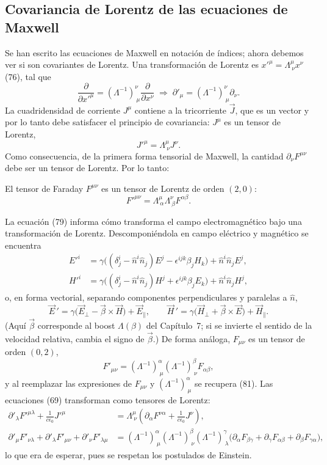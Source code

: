 \subsection{Covariancia de Lorentz de las ecuaciones de Maxwell}

Se han escrito las ecuaciones de Maxwell en notación de índices; ahora
debemos ver si son covariantes de Lorentz. Una transformación de
Lorentz es $x'^\mu=\Lambda^\mu_{\ \nu}x^\nu$ (76), tal que
\[
\frac{\partial}{\partial x'^\mu}=(\Lambda^{-1})^\nu_{\ \mu}\frac{
\partial}{\partial x^\nu}\;\Longrightarrow\;\partial'_\mu=(\Lambda^{-1})^
\nu_{\ \mu}\partial_\nu. \tag{77}
\]
La cuadridensidad de corriente $J^\mu$ contiene a la tricorriente $\vec
J$, que es un vector y por lo tanto debe satisfacer el principio de
covariancia: $J^\mu$ es un tensor de Lorentz,
\[
J'^\mu=\Lambda^\mu_{\ \nu}J^\nu . \tag{78}
\]
Como consecuencia, de la primera forma tensorial de Maxwell, la cantidad
$\partial_\nu F^{\mu\nu}$ debe ser un tensor de Lorentz. Por lo tanto:

\begin{definicion}
El tensor de Faraday $F^{\mu\nu}$ es un tensor de Lorentz de orden
$(2,0)$:
\[
F'^{\mu\nu}=\Lambda^\mu_{\ \alpha}\Lambda^\nu_{\ \beta}F^{\alpha\beta}.
\tag{79}
\]
\end{definicion}

La ecuación (79) informa cómo transforma el campo electromagnético bajo
una transformación de Lorentz. Descomponiéndola en campo eléctrico y
magnético se encuentra
\[
\begin{aligned}
E'^i &= \gamma\big((\delta^i_j-\hat n^i\hat n_j)E^j-\epsilon^{ijk}\beta_j
H_k\big)+\hat n^i\hat n_jE^j,\\
H'^i &= \gamma\big((\delta^i_j-\hat n^i\hat n_j)H^j+\epsilon^{ijk}
\beta_jE_k\big)+\hat n^i\hat n_jH^j,
\end{aligned} \tag{80}
\]
o, en forma vectorial, separando componentes perpendiculares y paralelas
a $\hat n$,
\[
\vec E\,'=\gamma\big(\vec E_\perp-\vec\beta\times\vec H\big)+\vec E_\parallel,
\qquad \vec H\,'=\gamma\big(\vec H_\perp+\vec\beta\times\vec E\big)+
\vec H_\parallel. \tag{81}
\]
(Aquí $\vec\beta$ corresponde al boost $\Lambda(\beta)$ del Capítulo~7;
si se invierte el sentido de la velocidad relativa, cambia el signo de
$\vec\beta$.) De forma análoga, $F_{\mu\nu}$ es un tensor de orden
$(0,2)$,
\[
F'_{\mu\nu}=(\Lambda^{-1})^\alpha_{\ \mu}(\Lambda^{-1})^\beta_{\ \nu}
F_{\alpha\beta}, \tag{82}
\]
y al reemplazar las expresiones de $F_{\mu\nu}$ y $(\Lambda^{-1})^\alpha_{
\ \mu}$ se recupera (81). Las ecuaciones (69) transforman como tensores
de Lorentz:
\[
\begin{aligned}
\partial'_\lambda F'^{\mu\lambda}+\frac{1}{c\epsilon_0}J'^\mu &=
\Lambda^\mu_{\ \nu}\left(\partial_\alpha F^{\nu\alpha}+\frac{1}{c
\epsilon_0}J^\nu\right),\\
\partial'_\mu F'_{\nu\lambda}+\partial'_\lambda F'_{\mu\nu}+\partial'_\nu
F'_{\lambda\mu} &= (\Lambda^{-1})^\alpha_{\ \mu}(\Lambda^{-1})^\beta_{\
\nu}(\Lambda^{-1})^\gamma_{\ \lambda}\big(\partial_\alpha F_{\beta\gamma}+
\partial_\gamma F_{\alpha\beta}+\partial_\beta F_{\gamma\alpha}\big),
\end{aligned} \tag{83}
\]
lo que era de esperar, pues se respetan los postulados de Einstein.

